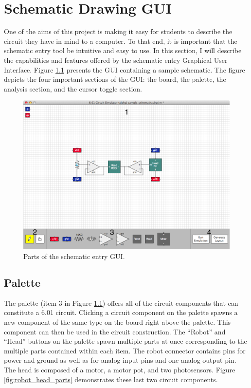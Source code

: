 
\chapter{Schematic Drawing GUI}
\label{app:gui}

One of the aims of this project is making it easy for students to describe the
circuit they have in mind to a computer. To that end, it is important that the
schematic entry tool be intuitive and easy to use. In this section, I will
describe the capabilities and features offered by the schematic entry Graphical
User Interface. Figure \ref{fig:gui} presents the GUI containing a sample
schematic. The figure depicts the four important sections of the GUI: the board,
the palette, the analysis section, and the cursor toggle section.

\begin{figure}
\begin{center}
\includegraphics[width=\textwidth]{Images/gui.png}
\caption{Parts of the schematic entry GUI.}
\label{fig:gui}
\end{center}
\end{figure}

\section{Palette}

The palette (item $3$ in Figure \ref{fig:gui}) offers all of the circuit
components that can constitute a 6.01 circuit. Clicking a circuit component on
the palette spawns a new component of the same type on the board right above
the palette. This component can then be used in the circuit construction. The
``Robot'' and ``Head'' buttons on the palette spawn multiple parts at once
corresponding to the multiple parts contained within each item. The robot
connector contains pins for power and ground as well as for analog input pins
and one analog output pin. The head is composed of a motor, a motor pot, and
two photosensors. Figure \ref{fig:robot_head_parts} demonstrates these last two
circuit components.

